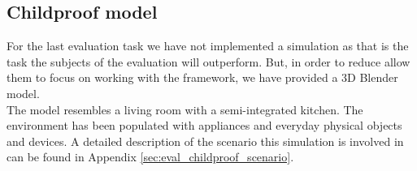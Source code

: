 \subsection{Childproof model} %
\label{subsec:impl_childproof_model}
For the last evaluation task we have not implemented a simulation as that is the task the subjects of the evaluation will outperform. But, in order to reduce allow them to focus on working with the framework, we have provided a 3D Blender model.\\

The model resembles a living room with a semi-integrated kitchen. The environment has been populated with appliances and everyday physical objects and devices. A detailed description of the scenario this simulation is involved in can be found in Appendix \ref{sec:eval_childproof_scenario}.

